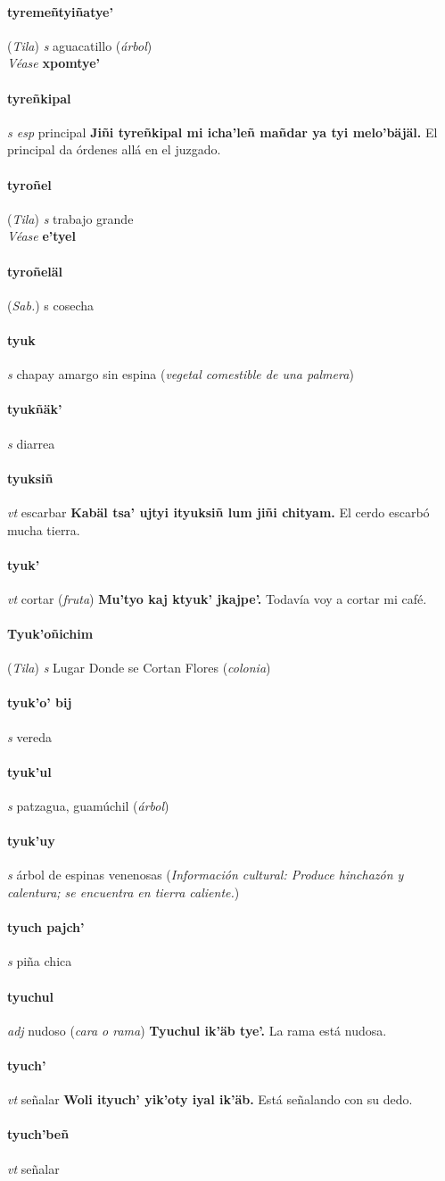 \documentclass{scrbook}
\newcommand{\entry}[1]{\paragraph{#1}}
\newcommand{\partofspeech}[1]{\textit{#1}}
\newcommand{\spanishtranslation}[1]{#1}
\newcommand{\clarification}[1]{(\textit{#1})}
\newcommand{\cholexample}[1]{\textbf{#1}}
\newcommand{\exampletranslation}[1]{#1}
\newcommand{\alsosee}[1]{\\\textit{Véase} \textbf{#1}}
\newcommand{\relevantdialect}[1]{(\textit{#1})}
\newcommand{\culturalinformation}[1]{(\textit{#1})}
\begin{document}
\begin{multicols}{2}
\entry{tyremeñtyiñatye'}
\relevantdialect{Tila}
\partofspeech{s}
\spanishtranslation{aguacatillo}
\clarification{árbol}
\alsosee{xpomtye'}

\entry{tyreñkipal}
\partofspeech{s esp}
\spanishtranslation{principal}
\cholexample{Jiñi tyreñkipal mi icha'leñ mañdar ya tyi melo'bäjäl.}
\exampletranslation{El principal da órdenes allá en el juzgado.}

\entry{tyroñel}
\relevantdialect{Tila}
\partofspeech{s}
\spanishtranslation{trabajo grande}
\alsosee{e'tyel}

\entry{tyroñeläl}
\relevantdialect{Sab.}
\spanishtranslation{s cosecha}

\entry{tyuk}
\partofspeech{s}
\spanishtranslation{chapay amargo sin espina}
\clarification{vegetal comestible de una palmera}

\entry{tyukñäk'}
\partofspeech{s}
\spanishtranslation{diarrea}

\entry{tyuksiñ}
\partofspeech{vt}
\spanishtranslation{escarbar}
\cholexample{Kabäl tsa' ujtyi ityuksiñ lum jiñi chityam.}
\exampletranslation{El cerdo escarbó mucha tierra.}

\entry{tyuk'}
\partofspeech{vt}
\spanishtranslation{cortar}
\clarification{fruta}
\cholexample{Mu'tyo kaj ktyuk' jkajpe'.}
\exampletranslation{Todavía voy a cortar mi café.}

\entry{Tyuk'oñichim}
\relevantdialect{Tila}
\partofspeech{s}
\spanishtranslation{Lugar Donde se Cortan Flores}
\clarification{colonia}

\entry{tyuk'o' bij}
\partofspeech{s}
\spanishtranslation{vereda}

\entry{tyuk'ul}
\partofspeech{s}
\spanishtranslation{patzagua, guamúchil}
\clarification{árbol}

\entry{tyuk'uy}
\partofspeech{s}
\spanishtranslation{árbol de espinas venenosas}
\culturalinformation{Información cultural: Produce hinchazón y calentura; se encuentra en tierra caliente.}

\entry{tyuch pajch'}
\partofspeech{s}
\spanishtranslation{piña chica}

\entry{tyuchul}
\partofspeech{adj}
\spanishtranslation{nudoso}
\clarification{cara o rama}
\cholexample{Tyuchul ik'äb tye'.}
\exampletranslation{La rama está nudosa.}

\entry{tyuch'}
\partofspeech{vt}
\spanishtranslation{señalar}
\cholexample{Woli ityuch' yik'oty iyal ik'äb.}
\exampletranslation{Está señalando con su dedo.}

\entry{tyuch'beñ}
\partofspeech{vt}
\spanishtranslation{señalar}


\end{multicols}
\end{document}
